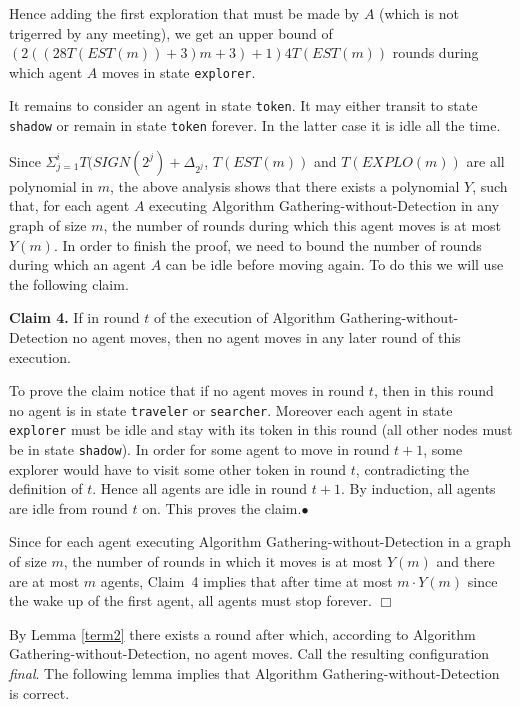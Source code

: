 \documentclass[11pt]{article}
\newcommand{\finclaim}{\hfill $\bullet$}
\newcommand{\qed}{\hfill $\Box$ \bigbreak}
\newenvironment{proof}{\noindent {\bf Proof.}}{\qed}
\begin{document}
\begin{proof}
{Hence adding the first exploration that must be made by $A$ (which is not trigerred by any meeting), we get an upper bound of {$(2((28T(EST(m))+3)m+3)+1) 4T(EST(m))$ rounds} during which agent $A$ moves in state {\tt explorer}.}
      
      It remains to consider an agent in state {\tt token}. It may either transit to state {\tt shadow} or remain in state {\tt token} forever.
      In the latter case it is idle all the time. 
      
      Since {{$\Sigma_{j=1}^{i} T(SIGN(2^j)+\Delta_{2^j}$}, $T(EST(m))$ and $T(EXPLO(m))$ are all polynomial in $m$}, the above
      analysis shows that there exists a polynomial $Y$, such that, for each agent $A$ executing Algorithm Gathering-without-Detection in any graph of size $m$, the 
      number of rounds during which this agent moves is at most $Y(m)$. In order to finish the proof, we need to bound the number of rounds during which an
      agent $A$ can be idle before moving again. To do this we will use the following claim.
      
      \vspace*{0.3cm}
      \noindent
      {{\bf Claim 4.}} If in round $t$ of the execution of Algorithm Gathering-without-Detection no agent moves, then no agent moves in any later round of this execution.
      
      To prove the claim notice that if no agent moves in round $t$, then in this round no agent is in state {\tt traveler} or {\tt searcher}.
      Moreover each agent in state  {\tt explorer} must be idle and stay with its token in this round (all other nodes must be in state {\tt shadow}).
      In order for some agent to move in round $t+1$, some explorer would have to visit some other token in round $t$, contradicting the definition of $t$.
      Hence all agents are idle in round $t+1$. By induction, all agents are idle from round $t$ on. This proves the claim.\finclaim
      


      Since for each agent executing Algorithm Gathering-without-Detection in a graph of size $m$, the number of rounds in which it moves is at most $Y(m)$
      and there are at most $m$ agents, {Claim~4} implies that after time at most  $m\cdot Y(m)$ since the wake up of the first agent, all agents must stop forever.
    \end{proof} 
    
    By Lemma \ref{term2} there exists a round after which, according to Algorithm Gathering-without-Detection,  no agent moves.
    Call the resulting configuration {\em final}. The following lemma implies  that  Algorithm Gathering-without-Detection is correct.
    
\end{document}
